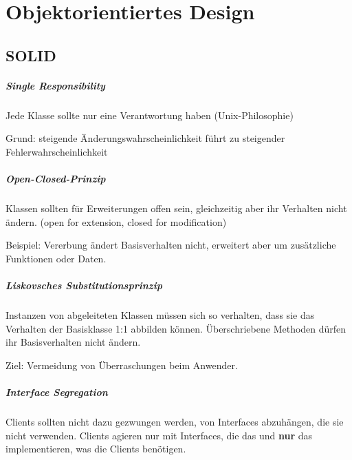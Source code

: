 \chapter{Objektorientiertes Design}\label{objektorientiertes-design}

\section{SOLID}\label{solid}

\paragraph{Single Responsibility}\label{single-responsibility}

Jede Klasse sollte nur eine Verantwortung haben (Unix-Philosophie)

Grund: steigende Änderungswahrscheinlichkeit führt zu steigender
Fehlerwahrscheinlichkeit

\paragraph{Open-Closed-Prinzip}\label{open-closed-prinzip}

Klassen sollten für Erweiterungen offen sein, gleichzeitig aber ihr
Verhalten nicht ändern. (open for extension, closed for modification)

Beispiel: Vererbung ändert Basisverhalten nicht, erweitert aber um
zusätzliche Funktionen oder Daten.

\paragraph{Liskovsches Substitutionsprinzip}\label{liskovsches-substitutionsprinzip}

Instanzen von abgeleiteten Klassen müssen sich so verhalten, dass sie
das Verhalten der Basisklasse 1:1 abbilden können. Überschriebene
Methoden dürfen ihr Basisverhalten nicht ändern.

Ziel: Vermeidung von Überraschungen beim Anwender.

\paragraph{Interface Segregation}\label{interface-segregation}

Clients sollten nicht dazu gezwungen werden, von Interfaces abzuhängen,
die sie nicht verwenden. Clients agieren nur mit Interfaces, die das und
\textbf{nur} das implementieren, was die Clients benötigen.

